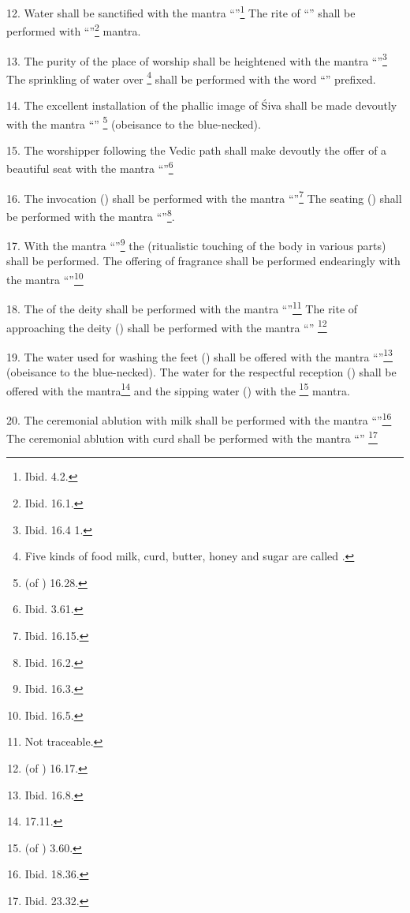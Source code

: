 12. Water shall be sanctified with the mantra “”\footnote{Ibid. 4.2.}
\etc The rite of “” shall be performed with
“”\footnote{Ibid. 16.1.} mantra.

13. The purity of the place of worship shall be heightened with the mantra
“”\footnote{Ibid. 16.4 1.} \etc The sprinkling of water over
\footnote{Five kinds of food \viz milk, curd, butter, honey and
sugar are called .} shall be performed with the word
“” prefixed.

14. The excellent installation of the phallic image of Śiva shall be made
devoutly with the mantra “”
\footnote{ (of ) 16.28.}
(obeisance to the blue-necked).

15. The worshipper following the Vedic path shall make devoutly the offer of
a beautiful seat with the mantra “”\footnote{Ibid. 3.61.} \etc

16. The invocation () shall be performed with the mantra
“”\footnote{Ibid. 16.15.} \etc The seating ()
shall be performed with the mantra “”\footnote{Ibid. 16.2.}.

17. With the mantra “”\footnote{Ibid. 16.3.} \etc the 
(ritualistic touching of the body in various parts) shall be performed.
The offering of fragrance shall be performed endearingly with the mantra
“”\footnote{Ibid. 16.5.} \etc

18. The  of the deity shall be performed with the mantra “”\footnote{Not traceable.} \etc The rite of approaching the deity
() shall be performed with the mantra “”
\footnote{ (of ) 16.17.} \etc

19. The water used for washing the feet () shall be offered with
the mantra “”\footnote{Ibid. 16.8.} (obeisance to
the blue-necked). The water for the respectful reception () shall be
offered with the  mantra\footnote{ 17.11.}
and the sipping water () with the 
\footnote{ (of ) 3.60.} mantra.

20. The ceremonial ablution with milk shall be performed with the mantra
“”\footnote{Ibid. 18.36.} \etc The ceremonial ablution with
curd shall be performed with the mantra “”
\footnote{Ibid. 23.32.} \etc

